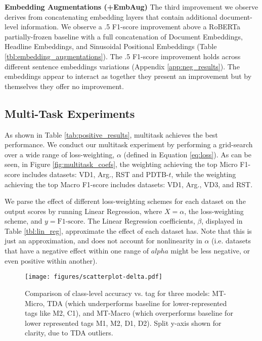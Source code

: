 \documentclass[11pt]{article}
\newcommand\spangh{VD3\xspace}
\newcommand\argumentation{Arg.\xspace}
\begin{document}
\noindent\textbf{Embedding Augmentations (+EmbAug)}
The third improvement we observe derives from concatenating embedding layers that contain additional document-level information. We observe a .5 F1-score improvement above a RoBERTa partially-frozen baseline with a full concatenation of Document Embeddings, Headline Embeddings, and Sinusoidal Positional Embeddings (Table \ref{tbl:embedding_augmentations}). The .5 F1-score improvement holds across different sentence embeddings variations (Appendix \ref{app:neg_results}). The embeddings appear to interact as together they present an improvement but by themselves they offer no improvement.

\subsection{Multi-Task Experiments}
\label{subsct:multitask_exp}

As shown in Table \ref{tab:positive_results}, multitask achieves the best performance.  We conduct our multitask experiment by performing a grid-search over a wide range of loss-weighting, $\alpha$ (defined in Equation \ref{eq:loss}). As can be seen, in Figure \ref{fig:multitask_coefs}, the weighting achieving the top Micro F1-score includes datasets: VD1, \argumentation, RST and PDTB-$t$, while the weighting achieving the top Macro F1-score includes datasets: VD1, \argumentation, \spangh, and RST.

We parse the effect of different loss-weighting schemes for each dataset on the output scores by running Linear Regression, where $X=\alpha$, the loss-weighting scheme, and $y=\text{F1-score}$. The Linear Regression coefficients, $\beta$, displayed in Table \ref{tbl:lin_reg}, approximate the effect of each dataset has. Note that this is just an approximation, and does not account for nonlinearity in $\alpha$ (i.e. datasets that have a negative effect within one range of $alpha$ might be less negative, or even positive within another).


\begin{figure}[t]
    \centering
    \texttt{[image: figures/scatterplot-delta.pdf]}
    \caption{Comparison of class-level accuracy vs. tag for three models: MT-Micro, TDA (which underperforms baseline for lower-represented tags like M2, C1), and MT-Macro (which overperforms baseline for lower represented tags M1, M2, D1, D2). Split y-axis shown for clarity, due to TDA outliers.}
    \label{fig:scatterplot}
\end{figure}
\end{document}
